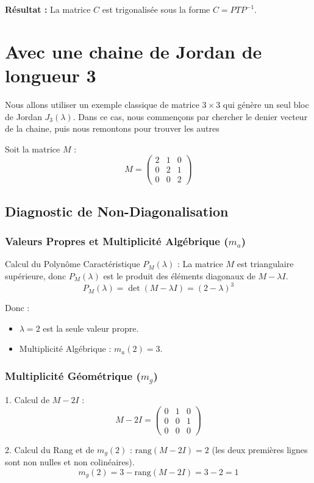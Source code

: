 \documentclass[french]{yLectureNote}
\begin{document}
\textbf{Résultat :} La matrice $C$ est trigonalisée sous la forme $C = P T P^{-1}$.
\section{Avec une chaine de Jordan de longueur 3}
Nous allons utiliser un exemple classique de matrice $3 \times 3$ qui génère un seul bloc de Jordan $J_3(\lambda)$. Dans ce cas, nous commençons par chercher le denier vecteur de la chaine, puis nous remontons pour trouver les autres

Soit la matrice $M$ :
$$M = \begin{pmatrix} 2 & 1 & 0 \\ 0 & 2 & 1 \\ 0 & 0 & 2 \end{pmatrix}$$

\subsection{Diagnostic de Non-Diagonalisation}

\subsubsection{Valeurs Propres et Multiplicité Algébrique ($m_a$)}

Calcul du Polynôme Caractéristique $P_M(\lambda)$ :
    La matrice $M$ est triangulaire supérieure, donc $P_M(\lambda)$ est le produit des éléments diagonaux de $M - \lambda I$.
    $$P_M(\lambda) = \det(M - \lambda I) = (2 - \lambda)^3$$

Donc :
\begin{itemize}
 \item $\lambda = 2$ est la seule valeur propre.
 \item Multiplicité Algébrique : $m_a(2) = 3$.
\end{itemize}
\subsubsection{Multiplicité Géométrique ($m_g$)}

1.  Calcul de $M - 2I$ :
    $$M - 2I = \begin{pmatrix} 0 & 1 & 0 \\ 0 & 0 & 1 \\ 0 & 0 & 0 \end{pmatrix}$$

2.  Calcul du Rang et de $m_g(2)$ :
    $\text{rang}(M - 2I) = 2$ (les deux premières lignes sont non nulles et non colinéaires).
    $$m_g(2) = 3 - \text{rang}(M - 2I) = 3 - 2 = 1$$
\end{document}
